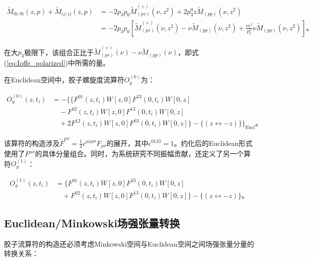 \documentclass[12pt,a4paper]{ctexart}
\theoremstyle{definition}
\begin{document}
\begin{equation}
\begin{aligned}
\tilde{M}_{0i;0i}(z,p) + \tilde{M}_{ij;ij}(z,p) &= -2p_3 p_0 \tilde{M}_{(ps)}^{(+)}(\nu, z^2) + 2p_3^0 z \tilde{M}_{(pp)}(\nu, z^2) \\
&= -2p_3 p_0 \left[ \tilde{M}_{(ps)}^{(+)}(\nu, z^2) - \nu \tilde{M}_{(pp)}(\nu, z^2) + \frac{m^2}{p_3^2} \nu \tilde{M}_{(pp)}(\nu, z^2) \right]。
\end{aligned}
\label{eq:helicity_decomp}
\end{equation}

在大$p_3$极限下，该组合正比于$\tilde{M}_{(ps)}^{(+)}(\nu) - \nu \tilde{M}_{(pp)}(\nu)$，即式(\ref{eq:Ioffe_polarized})中所需的量。

在Euclidean空间中，胶子螺旋度流算符$O^{(0)}_g$为\cite{NoteGluonPDFs}：

\begin{equation}
\begin{aligned}
O^{(0)}_g(z, t_i) &= -\Big\{ \{F^{01}(z,t_i)W[z,0]F^{23}(0,t_i)W[0,z] \\
&\quad - F^{02}(z,t_i)W[z,0]F^{13}(0,t_i)W[0,z] \\
&\quad + 2F^{12}(z,t_i)W[z,0]F^{03}(0,t_i)W[0,z]\} - \{ (z \leftrightarrow -z) \} \Big\}_{\text{Eucl}}。
\end{aligned}
\label{eq:gluon_helicity_current}
\end{equation}

该算符的构造涉及$\tilde{F}^{\mu\nu} = \frac{1}{2}\epsilon^{\mu\nu\rho\sigma}F_{\rho\sigma}$的展开，其中$\epsilon^{0123} = 1$。约化后的Euclidean形式使用了$F^{\mu\nu}$的具体分量组合。同时，为系统研究不同振幅贡献，还定义了另一个算符$O^{(1)}_g$\cite{NoteGluonPDFs}：

\begin{equation}
\begin{aligned}
O^{(1)}_g(z, t_i) &= \{F^{01}(z,t_i)W[z,0]F^{23}(0,t_i)W[0,z] \\
&\quad + F^{02}(z,t_i)W[z,0]F^{13}(0,t_i)W[0,z]\} - \{ (z \leftrightarrow -z) \}。
\end{aligned}
\label{eq:gluon_helicity_current2}
\end{equation}

\subsection{Euclidean/Minkowski场强张量转换}

胶子流算符的构造还必须考虑Minkowski空间与Euclidean空间之间场强张量分量的转换关系\cite{NoteGluonPDFs}：
\end{document}
